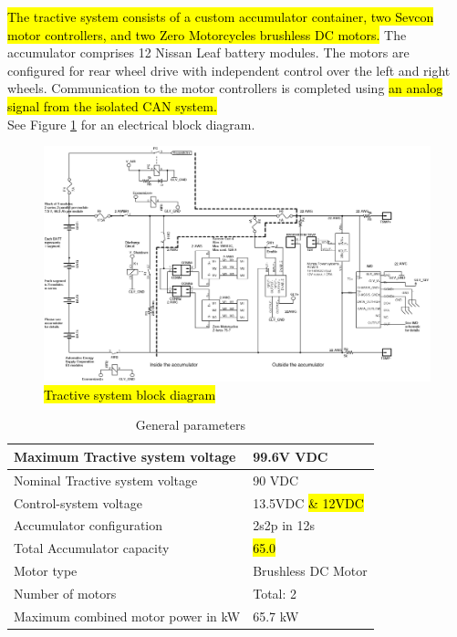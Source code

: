 \documentclass{article}
\DeclareRobustCommand{\hlr}[1]{{\sethlcolor{red}\hl{#1}}}
\begin{document}
    \hlr{The tractive system consists of a custom accumulator container, two Sevcon motor controllers, and two Zero Motorcycles brushless DC motors.} The accumulator comprises 12 Nissan Leaf battery modules. The motors are configured for rear wheel drive with independent control over the left and right wheels. Communication to the motor controllers is completed using \hlr{an analog signal from the isolated CAN system.}\\

    See Figure \ref{tractive} for an electrical block diagram.

        \begin{figure}
            \includegraphics[width=\textheight]{tractiveblock}
            \caption{\hlr{Tractive system block diagram}}
            \label{tractive}
        \end{figure}

        \begin{table}[H]
            \centering
            \begin{tabular}{|l|l|}
            \hline
                Maximum Tractive system voltage & 99.6V VDC \\ \hline
                Nominal Tractive system voltage & 90 VDC \\ \hline
                Control-system voltage & 13.5VDC \hlr{\& 12VDC}\\ \hline
                Accumulator configuration & 2s2p in 12s \\ \hline
                Total Accumulator capacity & \hlr{65.0} \\ \hline
                Motor type & Brushless DC Motor \\ \hline
                Number of motors & Total: 2 \\ \hline
                Maximum combined motor power in kW & 65.7 kW \\ \hline
            \end{tabular}
            \caption{General parameters}
            \label{systemtable}
        \end{table}
\end{document}
